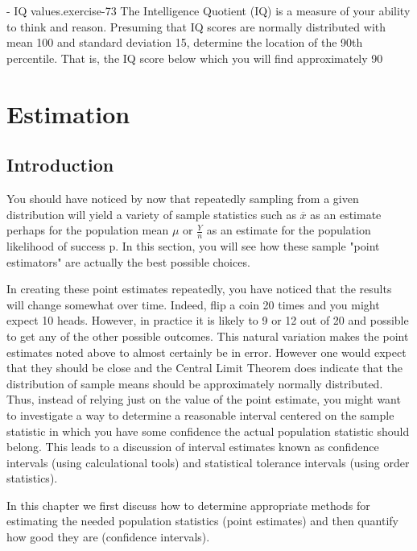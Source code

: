 \documentclass[10pt,]{book}
\numberwithin{equation}{section}
\begin{document}
\begin{inlineexercise}{- IQ values.}{exercise-73}%
\hypertarget{p-1092}{}%
The Intelligence Quotient (IQ) is a measure of your ability to think and reason. Presuming that IQ scores are normally distributed with mean 100 and standard deviation 15, determine the location of the 90th percentile.  That is, the IQ score below which you will find approximately 90%
\end{inlineexercise}
%
%
\typeout{************************************************}
\typeout{************************************************}
%
\chapter[{Estimation}]{Estimation}\label{IntervalEstimation}
%
%
\typeout{************************************************}
\typeout{************************************************}
%
\section[{Introduction}]{Introduction}\label{section-65}
\hypertarget{p-1093}{}%
You should have noticed by now that repeatedly sampling from a given distribution will yield a variety of sample statistics such as \(\overline{x}\) as an estimate perhaps for the population mean \(\mu\) or \(\frac{Y}{n}\) as an estimate for the population likelihood of success p. In this section, you will see how these sample "point estimators" are actually the best possible choices.%
\par
\hypertarget{p-1094}{}%
In creating these point estimates repeatedly, you have noticed that the results will change somewhat over time. Indeed, flip a coin 20 times and you might expect 10 heads. However, in practice it is likely to 9 or 12 out of 20 and possible to get any of the other possible outcomes. This natural variation makes the point estimates noted above to almost certainly be in error. However one would expect that they should be close and the Central Limit Theorem does indicate that the distribution of sample means should be approximately normally distributed. Thus, instead of relying just on the value of the point estimate, you might want to investigate a way to determine a reasonable interval centered on the sample statistic in which you have some confidence the actual population statistic should belong. This leads to a discussion of interval estimates known as confidence intervals (using calculational tools) and statistical tolerance intervals (using order statistics).%
\par
\hypertarget{p-1095}{}%
In this chapter we first discuss how to determine appropriate methods for estimating the needed population statistics (point estimates) and then quantify how good they are (confidence intervals).%
%
%
\typeout{************************************************}
\typeout{************************************************}
%
\end{document}
